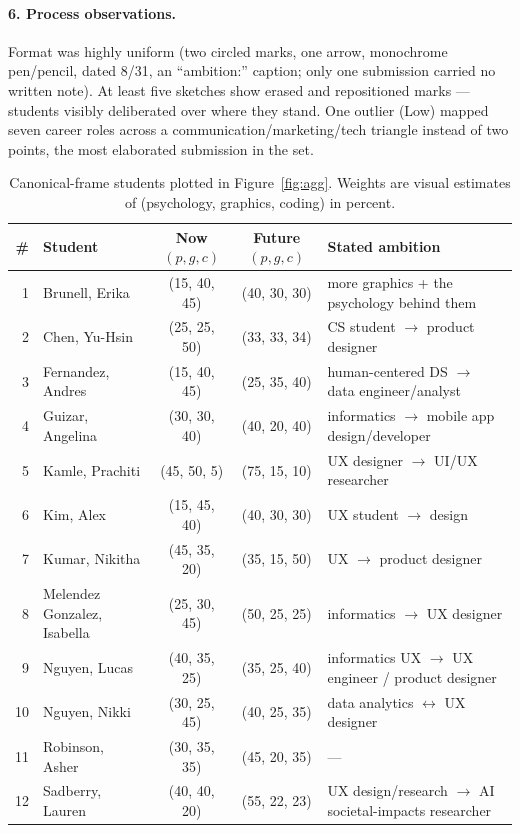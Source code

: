 \documentclass[11pt]{article}
\begin{document}
\paragraph{6. Process observations.} Format was highly uniform (two circled
marks, one arrow, monochrome pen/pencil, dated 8/31, an ``ambition:'' caption;
only one submission carried no written note). At least five sketches show
erased and repositioned marks --- students visibly deliberated over where they
stand. One outlier (Low) mapped seven career roles across a
communication/marketing/tech triangle instead of two points, the most
elaborated submission in the set.

\begin{table}[htbp]
\centering\small
\caption{Canonical-frame students plotted in Figure~\ref{fig:agg}. Weights are
visual estimates of (psychology, graphics, coding) in percent.}
\label{tab:students}
\begin{tabularx}{\textwidth}{@{}r l c c >{\RaggedRight\arraybackslash}X@{}}
\toprule
\# & Student & Now $(p,g,c)$ & Future $(p,g,c)$ & Stated ambition \\
\midrule
1 & Brunell, Erika & (15, 40, 45) & (40, 30, 30) & more graphics + the psychology behind them \\
2 & Chen, Yu-Hsin & (25, 25, 50) & (33, 33, 34) & CS student $\to$ product designer \\
3 & Fernandez, Andres & (15, 40, 45) & (25, 35, 40) & human-centered DS $\to$ data engineer/analyst \\
4 & Guizar, Angelina & (30, 30, 40) & (40, 20, 40) & informatics $\to$ mobile app design/developer \\
5 & Kamle, Prachiti & (45, 50, 5) & (75, 15, 10) & UX designer $\to$ UI/UX researcher \\
6 & Kim, Alex & (15, 45, 40) & (40, 30, 30) & UX student $\to$ design \\
7 & Kumar, Nikitha & (45, 35, 20) & (35, 15, 50) & UX $\to$ product designer \\
8 & Melendez Gonzalez, Isabella & (25, 30, 45) & (50, 25, 25) & informatics $\to$ UX designer \\
9 & Nguyen, Lucas & (40, 35, 25) & (35, 25, 40) & informatics UX $\to$ UX engineer / product designer \\
10 & Nguyen, Nikki & (30, 25, 45) & (40, 25, 35) & data analytics $\leftrightarrow$ UX designer \\
11 & Robinson, Asher & (30, 35, 35) & (45, 20, 35) & --- \\
12 & Sadberry, Lauren & (40, 40, 20) & (55, 22, 23) & UX design/research $\to$ AI societal-impacts researcher \\

\end{tabularx}
\end{table}
\end{document}
